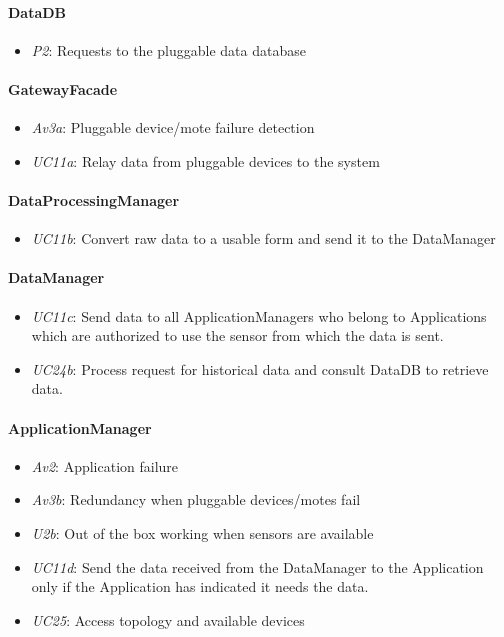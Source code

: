 \documentclass[english]{sareport}
\begin{document}
\paragraph{DataDB}
\begin{itemize}
	\item \emph{P2}: Requests to the pluggable data database
\end{itemize}

\paragraph{GatewayFacade}
\begin{itemize}
	\item \emph{Av3a}: Pluggable device/mote failure detection
	\item \emph{UC11a}: Relay data from pluggable devices to the system
\end{itemize}

\paragraph{DataProcessingManager}
\begin{itemize}
	\item \emph{UC11b}: Convert raw data to a usable form and send it to the DataManager
\end{itemize}

\paragraph{DataManager}
\begin{itemize}
	\item \emph{UC11c}: Send data to all ApplicationManagers who belong to Applications which are authorized to use the sensor from which the data is sent.
	\item \emph{UC24b}: Process request for historical data and consult DataDB to retrieve data.
\end{itemize}

\paragraph{ApplicationManager}
\begin{itemize}
	\item \emph{Av2}: Application failure
	\item \emph{Av3b}: Redundancy when pluggable devices/motes fail
	\item \emph{U2b}: Out of the box working when sensors are available
	\item \emph{UC11d}: Send the data received from the DataManager to the Application only if the Application has indicated it needs the data.
	\item \emph{UC25}: Access topology and available devices
\end{itemize}
\end{document}
